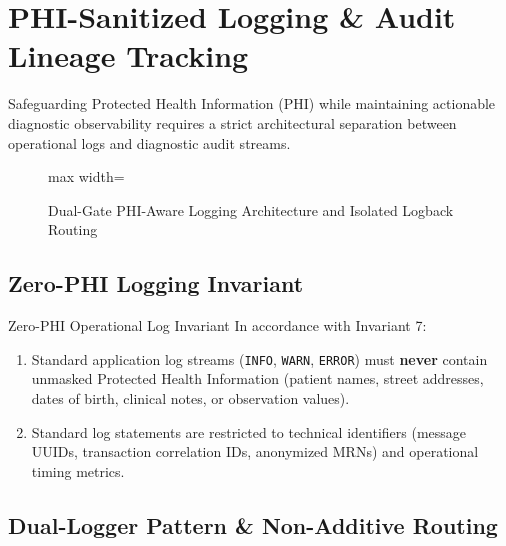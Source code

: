 
\chapter{PHI-Sanitized Logging \& Audit Lineage Tracking}
\label{chap:phi_logging}

Safeguarding Protected Health Information (PHI) while maintaining actionable diagnostic observability requires a strict architectural separation between operational logs and diagnostic audit streams.

\begin{figure}[htbp]
    \centering
    \begin{adjustbox}{max width=\textwidth}
        
    \end{adjustbox}
    \caption{Dual-Gate PHI-Aware Logging Architecture and Isolated Logback Routing}
    \label{fig:phi_logging_architecture}
\end{figure}

\section{Zero-PHI Logging Invariant}

\begin{principlebox}{Zero-PHI Operational Log Invariant}
In accordance with Invariant 7:
\begin{enumerate}
    \item Standard application log streams (\texttt{INFO}, \texttt{WARN}, \texttt{ERROR}) must \textbf{never} contain unmasked Protected Health Information (patient names, street addresses, dates of birth, clinical notes, or observation values).
    \item Standard log statements are restricted to technical identifiers (message UUIDs, transaction correlation IDs, anonymized MRNs) and operational timing metrics.
\end{enumerate}
\end{principlebox}

\section{Dual-Logger Pattern \& Non-Additive Routing}

